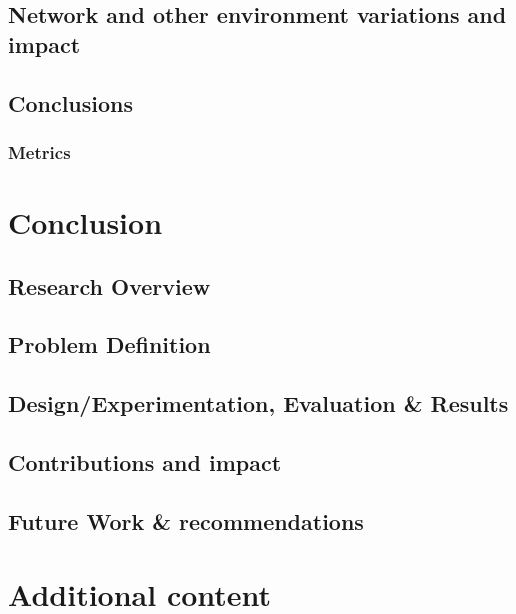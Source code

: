\documentclass[oneside,12pt]{book}
\begin{document}
\section{Network and other environment variations and impact}

\section{Conclusions}

\subsection{Metrics}



\chapter{Conclusion}
\section{Research Overview}
\section{Problem Definition}
\section{Design/Experimentation, Evaluation \& Results}
\section{Contributions and impact}
\section{Future Work \& recommendations}





\appendix
\chapter{Additional content}
\end{document}
